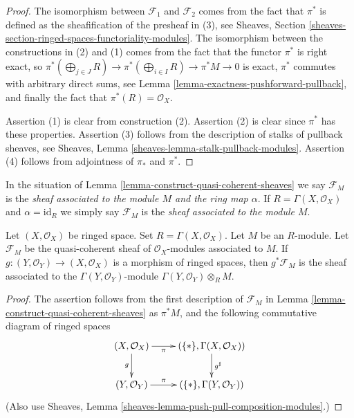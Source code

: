 \begin{proof}
The isomorphism between $\mathcal{F}_1$ and $\mathcal{F}_2$
comes from the fact that $\pi^*$ is defined as the sheafification
of the presheaf in (3), see Sheaves, Section
\ref{sheaves-section-ringed-spaces-functoriality-modules}.
The isomorphism between the constructions in (2) and (1) comes
from the fact that the functor $\pi^*$ is right exact, so
$\pi^*(\bigoplus_{j \in J} R) \to \pi^*(\bigoplus_{i \in I} R) \to
\pi^*M \to 0$ is exact, $\pi^*$ commutes with arbitrary
direct sums, see Lemma \ref{lemma-exactness-pushforward-pullback},
and finally the fact that $\pi^*(R) = \mathcal{O}_X$.

\medskip\noindent
Assertion (1) is clear from construction (2).
Assertion (2) is clear since $\pi^*$ has these properties.
Assertion (3) follows from the description of stalks of
pullback sheaves, see
Sheaves, Lemma \ref{sheaves-lemma-stalk-pullback-modules}.
Assertion (4) follows from adjointness of $\pi_*$ and
$\pi^*$.
\end{proof}

\begin{definition}
\label{definition-sheaf-associated}
In the situation of Lemma \ref{lemma-construct-quasi-coherent-sheaves}
we say $\mathcal{F}_M$ is the {\it sheaf associated to the module $M$
and the ring map $\alpha$}. If $R = \Gamma(X, \mathcal{O}_X)$
and $\alpha = \text{id}_R$ we simply say $\mathcal{F}_M$ is the
{\it sheaf associated to the module $M$}.
\end{definition}


\begin{lemma}
\label{lemma-restrict-quasi-coherent}
Let $(X, \mathcal{O}_X)$ be ringed space.
Set $R = \Gamma(X, \mathcal{O}_X)$.
Let $M$ be an $R$-module.
Let $\mathcal{F}_M$ be the quasi-coherent sheaf of
$\mathcal{O}_X$-modules associated to $M$.
If $g : (Y, \mathcal{O}_Y) \to (X, \mathcal{O}_X)$
is a morphism of ringed spaces, then
$g^*\mathcal{F}_M$ is the sheaf associated
to the $\Gamma(Y, \mathcal{O}_Y)$-module
$\Gamma(Y, \mathcal{O}_Y) \otimes_R M$.
\end{lemma}

\begin{proof}
The assertion follows from the first description
of $\mathcal{F}_M$ in Lemma \ref{lemma-construct-quasi-coherent-sheaves}
as $\pi^*M$, and the following commutative diagram
of ringed spaces
$$
\xymatrix{
(X, \mathcal{O}_X) \ar[r]_-\pi \ar[d]_g &
(\{*\}, \Gamma(X, \mathcal{O}_X)) \ar[d]^{g^\sharp} \\
(Y, \mathcal{O}_Y) \ar[r]^-\pi &
(\{*\}, \Gamma(Y, \mathcal{O}_Y))
}
$$
(Also use Sheaves, Lemma \ref{sheaves-lemma-push-pull-composition-modules}.)
\end{proof}

